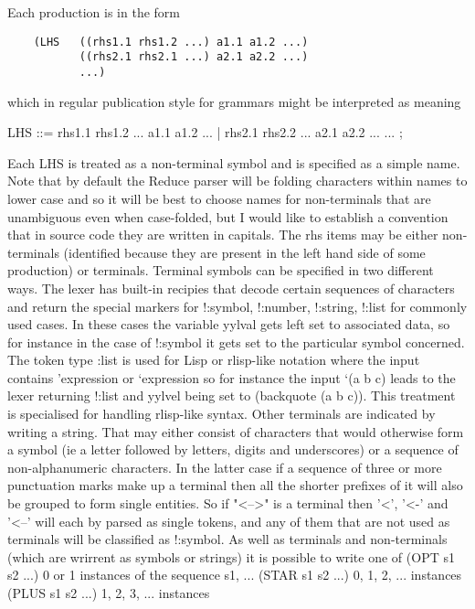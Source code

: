 \documentclass{article}
\begin{document}
Each production is in the form
\begin{verbatim}
    (LHS   ((rhs1.1 rhs1.2 ...) a1.1 a1.2 ...)
           ((rhs2.1 rhs2.1 ...) a2.1 a2.2 ...)
           ...)
\end{verbatim}
\noindent which in regular publication style for grammars might be interpreted
as meaning
\begin{tabular}
     LHS ::= rhs1.1 rhs1.2 ... { a1.1 a1.2 ... }
         |   rhs2.1 rhs2.2 ... { a2.1 a2.2 ... }
         ...
         ;
\end{tabular}
Each LHS is treated as a non-terminal symbol and is specified as a simple
name. Note that by default the Reduce parser will be folding characters
within names to lower case and so it will be best to choose names for
non-terminals that are unambiguous even when case-folded, but I would like
to establish a convention that in source code they are written in capitals.
%
The rhs items may be either non-terminals (identified because they are
present in the left hand side of some production) or terminals. Terminal
symbols can be specified in two different ways.
The lexer has built-in recipies that decode certain sequences of characters
and return the special markers for !:symbol, !:number, !:string, !:list for
commonly used cases. In these cases the variable yylval gets left set
to associated data, so for instance in the case of !:symbol it gets set
to the particular symbol concerned.
The token type :list is used for Lisp or rlisp-like notation where the
input contains
    'expression
or  `expression
so for instance the input `(a b c) leads to the lexer returning !:list and
yylvel being set to (backquote (a b c)). This treatment is specialised for
handling rlisp-like syntax.
%
Other terminals are indicated by writing a string. That may either
consist of characters that would otherwise form a symbol (ie a letter
followed by letters, digits and underscores) or a sequence of
non-alphanumeric characters. In the latter case if a sequence of three or
more punctuation marks make up a terminal then all the shorter prefixes
of it will also be grouped to form single entities. So if "<-->" is a
terminal then '<', '<-' and '<--' will each by parsed as single tokens, and
any of them that are not used as terminals will be classified as !:symbol.
%
As well as terminals and non-terminals (which are wrirrent as symbols or
strings) it is possible to write one of
    (OPT s1 s2 ...)           0 or 1 instances of the sequence s1, ...
    (STAR s1 s2 ...)          0, 1, 2, ... instances
    (PLUS s1 s2 ...)          1, 2, 3, ... instances
\end{document}
